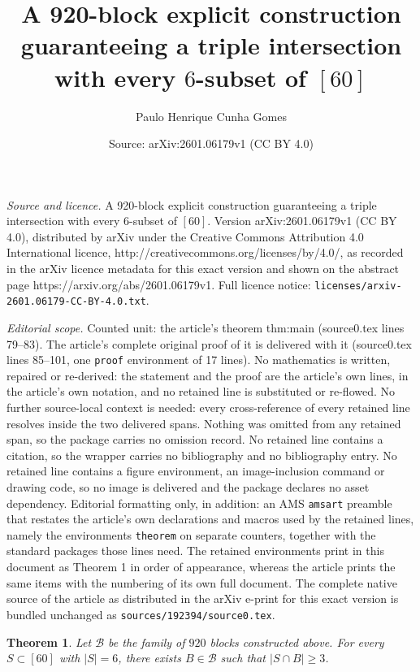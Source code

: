 \documentclass[10pt,a4paper]{amsart}
\title{A 920-block explicit construction guaranteeing a triple intersection with every $6$-subset of $[60]$}
\author{Paulo Henrique Cunha Gomes}
\date{Source: arXiv:2601.06179v1 (CC BY 4.0)}
\newtheorem{theorem}{Theorem}
\begin{document}
\maketitle

\noindent\emph{Source and licence.} A 920-block explicit construction guaranteeing a triple intersection with every $6$-subset of $[60]$. Version arXiv:2601.06179v1 (CC BY 4.0), distributed by arXiv under the Creative Commons Attribution 4.0 International licence, http://creativecommons.org/licenses/by/4.0/, as recorded in the arXiv licence metadata for this exact version and shown on the abstract page https://arxiv.org/abs/2601.06179v1. Full licence notice: \texttt{licenses/arxiv-2601.06179-CC-BY-4.0.txt}.\par\smallskip

\noindent\textit{Editorial scope.} Counted unit: the article's theorem thm:main (source0.tex lines 79--83). The article's complete original proof of it is delivered with it (source0.tex lines 85--101, one \texttt{proof} environment of 17 lines). No mathematics is written, repaired or re-derived: the statement and the proof are the article's own lines, in the article's own notation, and no retained line is substituted or re-flowed.  No further source-local context is needed: every cross-reference of every retained line resolves inside the two delivered spans.  Nothing was omitted from any retained span, so the package carries no omission record.  No retained line contains a citation, so the wrapper carries no bibliography and no bibliography entry.  No retained line contains a figure environment, an image-inclusion command or drawing code, so no image is delivered and the package declares no asset dependency.  Editorial formatting only, in addition: an AMS \texttt{amsart} preamble that restates the article's own declarations and macros used by the retained lines, namely the environments \texttt{theorem} on separate counters, together with the standard packages those lines need.  The retained environments print in this document as Theorem 1 in order of appearance, whereas the article prints the same items with the numbering of its own full document.  The complete native source of the article as distributed in the arXiv e-print for this exact version is bundled unchanged as \texttt{sources/192394/source0.tex}.
\begin{theorem}\label{thm:main}
Let $\mathcal{B}$ be the family of $920$ blocks constructed above.
For every $S\subset[60]$ with $|S|=6$, there exists $B\in\mathcal{B}$ such that
$|S\cap B|\ge 3$.
\end{theorem}
\end{document}
